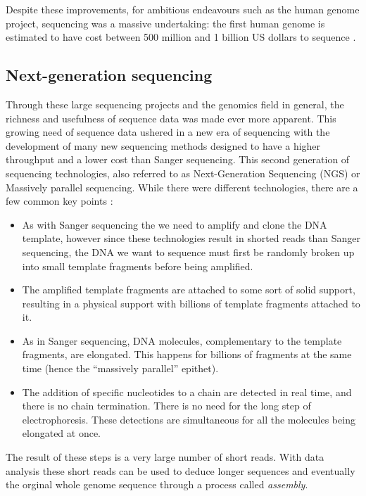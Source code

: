 \documentclass[
  11pt,
  twoside]{scrbook}
\begin{document}
Despite these improvements, for ambitious endeavours such as the human genome project, sequencing was a massive undertaking: the first human genome is estimated to have cost between 500 million and 1 billion US dollars to sequence \autocite{CostSequencingHuman}.

\hypertarget{next-generation-sequencing}{%
\subsection{Next-generation sequencing}\label{next-generation-sequencing}}

Through these large sequencing projects and the genomics field in general, the richness and usefulness of sequence data was made ever more apparent. This growing need of sequence data ushered in a new era of sequencing with the development of many new sequencing methods designed to have a higher throughput and a lower cost than Sanger sequencing. This second generation of sequencing technologies, also referred to as Next-Generation Sequencing (NGS) or Massively parallel sequencing. While there were different technologies, there are a few common key points \autocite{metzkerSequencingTechnologiesNext2010}:

\begin{itemize}
\item
  As with Sanger sequencing the we need to amplify and clone the DNA template, however since these technologies result in shorted reads than Sanger sequencing, the DNA we want to sequence must first be randomly broken up into small template fragments before being amplified.
\item
  The amplified template fragments are attached to some sort of solid support, resulting in a physical support with billions of template fragments attached to it.
\item
  As in Sanger sequencing, DNA molecules, complementary to the template fragments, are elongated. This happens for billions of fragments at the same time (hence the ``massively parallel'' epithet).
\item
  The addition of specific nucleotides to a chain are detected in real time, and there is no chain termination. There is no need for the long step of electrophoresis. These detections are simultaneous for all the molecules being elongated at once.
\end{itemize}

The result of these steps is a very large number of short reads. With data analysis these short reads can be used to deduce longer sequences and eventually the orginal whole genome sequence through a process called \emph{assembly}.
\end{document}
